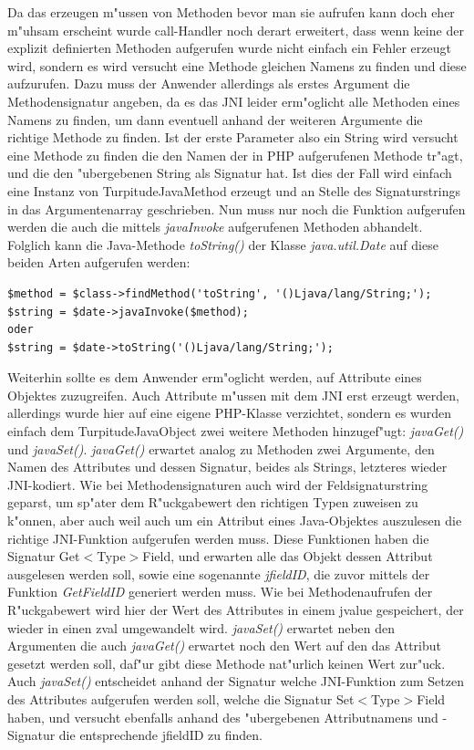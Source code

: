 Da das erzeugen m"ussen von Methoden bevor man sie aufrufen kann doch eher m"uhsam erscheint wurde call-Handler noch derart erweitert, dass wenn keine der
explizit definierten Methoden aufgerufen wurde nicht einfach ein Fehler erzeugt wird, sondern es wird versucht eine Methode gleichen Namens zu finden und diese
aufzurufen. Dazu muss der Anwender allerdings als erstes Argument die Methodensignatur angeben, da es das JNI leider erm"oglicht alle Methoden eines Namens
zu finden, um dann eventuell anhand der weiteren Argumente die richtige Methode zu finden. Ist der erste Parameter also ein String wird versucht eine
Methode zu finden die den Namen der in PHP aufgerufenen Methode tr"agt, und die den "ubergebenen String als Signatur hat. Ist dies der Fall wird einfach 
eine Instanz von TurpitudeJavaMethod erzeugt und an Stelle des Signaturstrings in das Argumentenarray geschrieben. Nun muss nur noch die Funktion aufgerufen
werden die auch die mittels \emph{javaInvoke} aufgerufenen Methoden abhandelt. Folglich kann die Java-Methode \emph{toString()} der Klasse \emph{java.util.Date}
auf diese beiden Arten aufgerufen werden:
\begin{lstlisting}[caption=Zwei Arten die gleiche Methode aufzurufen]
$method = $class->findMethod('toString', '()Ljava/lang/String;');
$string = $date->javaInvoke($method);
oder
$string = $date->toString('()Ljava/lang/String;');
\end{lstlisting}
Weiterhin sollte es dem Anwender erm"oglicht werden, auf Attribute eines Objektes zuzugreifen. Auch Attribute m"ussen mit dem JNI erst erzeugt werden, allerdings
wurde hier auf eine eigene PHP-Klasse verzichtet, sondern es wurden einfach dem TurpitudeJavaObject zwei weitere Methoden hinzugef"ugt: \emph{javaGet()} und
\emph{javaSet()}. \emph{javaGet()} erwartet analog zu Methoden zwei Argumente, den Namen des Attributes und dessen Signatur, beides als Strings, letzteres wieder
JNI-kodiert. Wie bei Methodensignaturen auch wird der Feldsignaturstring geparst, um sp"ater dem R"uckgabewert den richtigen Typen zuweisen zu k"onnen, aber auch
weil auch um ein Attribut eines Java-Objektes auszulesen die richtige JNI-Funktion aufgerufen werden muss. Diese Funktionen haben die Signatur
Get$<$Type$>$Field, und erwarten alle das Objekt dessen Attribut ausgelesen werden soll, sowie eine sogenannte \emph{jfieldID}, die zuvor mittels der Funktion
\emph{GetFieldID} generiert werden muss. Wie bei Methodenaufrufen der R"uckgabewert wird hier der Wert des Attributes in einem jvalue gespeichert, der wieder
in einen zval umgewandelt wird. \emph{javaSet()} erwartet neben den Argumenten die auch \emph{javaGet()} erwartet noch den Wert auf den das Attribut gesetzt werden
soll, daf"ur gibt diese Methode nat"urlich keinen Wert zur"uck. Auch \emph{javaSet()} entscheidet anhand der Signatur welche JNI-Funktion zum Setzen des
Attributes aufgerufen werden soll, welche die Signatur Set$<$Type$>$Field haben, und versucht ebenfalls anhand des "ubergebenen Attributnamens und -Signatur die
entsprechende jfieldID zu finden.

